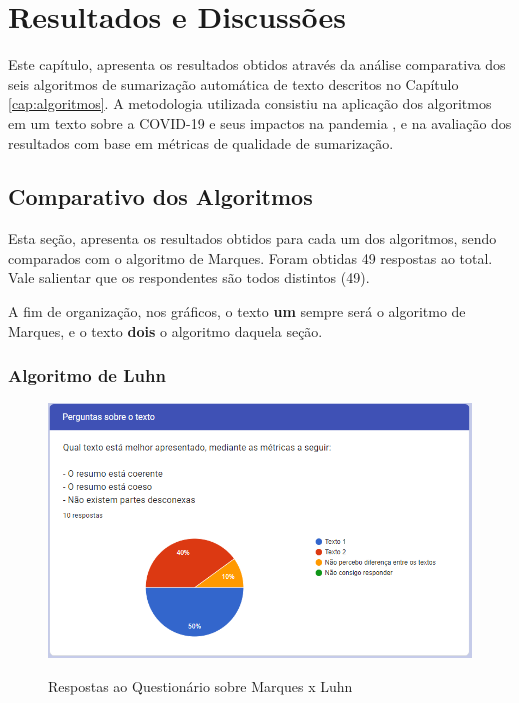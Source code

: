 \chapter{Resultados e Discussões}
\label{chap:resultados}
Este capítulo, apresenta os resultados obtidos através da análise comparativa dos seis algoritmos de sumarização automática de texto descritos no Capítulo \ref{cap:algoritmos}. A metodologia utilizada consistiu na aplicação dos algoritmos em um texto sobre a COVID-19 e seus impactos na pandemia \cite{MALTA2020}, e na avaliação dos resultados com base em métricas de qualidade de sumarização.

\section{Comparativo dos Algoritmos}
\label{chap:comparativo}
Esta seção, apresenta os resultados obtidos para cada um dos algoritmos, sendo comparados com o algoritmo de Marques. Foram obtidas 49 respostas ao total. Vale salientar que os respondentes são todos distintos (49).

A fim de organização, nos gráficos, o texto \textbf{um} sempre será o algoritmo de Marques, e o texto \textbf{dois} o algoritmo daquela seção.

\subsection{Algoritmo de Luhn}
\label{chap:luhn}

\begin{figure}[h]
    \centering
    \caption{Respostas ao Questionário sobre Marques x Luhn}
    \includegraphics[width=\textwidth]{figuras/graficos/luhn.png}
    \label{fig:luhn_grafico}
\end{figure}


